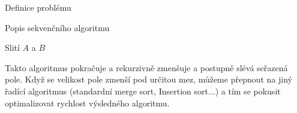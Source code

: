 \documentclass[a4paper,11pt]{article}
\begin{document}
\begin{section}{Definice problému}
\begin{subsection}{Popis sekvenčního algoritmu}
\begin{table}[ht]
\caption{Slití $A$ a $B$}
\end{table}

Takto algoritmus pokračuje a rekurzivně zmenšuje a postupně slévá seřazená pole. Když se velikost pole zmenší pod určitou
mez, můžeme přepnout na jiný řadící algoritmus (standardní merge sort, Insertion sort...) a tím se pokusit optimalizovat
rychlost výsledného algoritmu.



\end{subsection}
\end{section}
\end{document}
